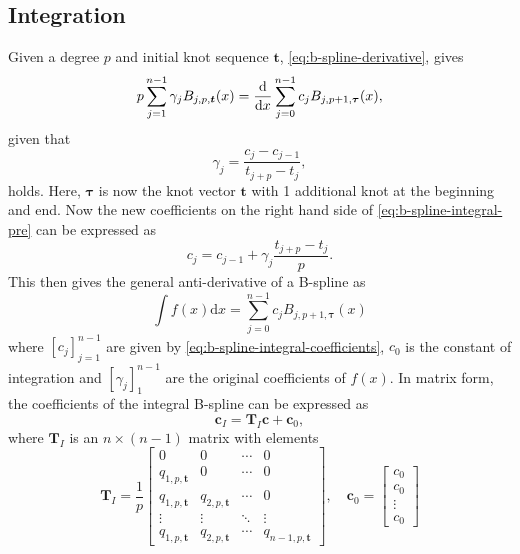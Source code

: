 \subsection{Integration}
Given a degree $p$ and initial knot sequence $\mathbf t$, \cref{eq:b-spline-derivative}, gives
\begin{equation}\label{eq:b-spline-integral-pre}
    p \sum_{j=1}^{n-1} \gamma_j B_{j, p, \boldsymbol{t}}(x) 
    = \frac{\rm d}{\mathrm dx} \sum_{j=0}^{n-1} c_j B_{j, p+1, \boldsymbol{\tau}}(x),
\end{equation}
given that
\begin{equation}
    \gamma_j = \frac{c_j-c_{j-1}}{t_{j+p}-t_j},
\end{equation}
holds. Here, $\boldsymbol{\tau}$ is now the knot vector $\mathbf{t}$ with 1 additional knot at the beginning and end. Now
the new coefficients on the right hand side of \cref{eq:b-spline-integral-pre} can be expressed as 
\begin{equation}\label{eq:b-spline-integral-coefficients}
    c_j = c_{j-1} + \gamma_j \frac{t_{j+p}-t_j}{p}.
\end{equation}
This then gives the general anti-derivative of a B-spline as
\begin{equation}\label{eq:b-spline-integral}
    \int f(x) \mathrm dx = \sum_{j=0}^{n-1} c_j B_{j, p+1, \boldsymbol{\tau}}(x)
\end{equation}
where $[c_j]_{j=1}^{n-1}$ are given by \cref{eq:b-spline-integral-coefficients}, $c_0$ is the constant of integration and $[\gamma_j]_1^{n-1}$ are the original coefficients of $f(x)$. In matrix form, the coefficients of the integral B-spline can be expressed as
\begin{equation}\label{eq:b-spline-integral-matrix}
    \mathbf{c}_I = \mathbf T_I \mathbf{c} + \mathbf{c}_0,
\end{equation}
where $\mathbf T_I$ is an $n \times (n-1)$ matrix with elements
\begin{equation}
    \mathbf T_I = \frac{1}{p}\begin{bmatrix}
        0 & 0 & \cdots & 0 \\
        q_{1,p,\mathbf{t}} & 0 & \cdots & 0 \\
        q_{1,p,\mathbf{t}} & q_{2,p,\mathbf{t}} & \cdots & 0 \\
        \vdots & \vdots & \ddots & \vdots \\
        q_{1,p,\mathbf{t}} & q_{2,p,\mathbf{t}} & \cdots & q_{n-1,p,\mathbf{t}}
    \end{bmatrix},\quad
    \mathbf{c}_0 = \begin{bmatrix}
        c_0 \\
        c_0 \\
        \vdots \\
        c_0
    \end{bmatrix}
\end{equation}

